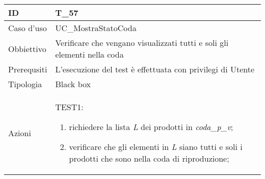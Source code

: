 \begin{table}[hb]
    \centering
    \begin{tabular}{ |p{2cm}|p{10cm}|  }
        \hline
        ID          & T\_57                                                                 \\\hline
        Caso d'uso  & UC\_MostraStatoCoda                                                    \\\hline
        Obbiettivo  & Verificare che vengano visualizzati tutti e soli gli elementi nella coda \\\hline
        Prerequsiti & L'esecuzione del test è effettuata con privilegi di Utente            \\\hline
        Tipologia   & Black box                                                             \\\hline
        Azioni      &
        TEST1:
        \begin{enumerate}[nosep, topsep=0pt]
            \item richiedere la lista \emph{L} dei prodotti in \emph{coda\_p\_v};
            \item verificare che gli elementi in \emph{L} siano tutti e soli i prodotti che sono nella
            coda di riproduzione;
        \end{enumerate}
        \\\hline
    \end{tabular}
\end{table}

